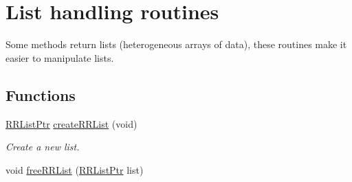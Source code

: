 \hypertarget{group__list}{\section{List handling routines}
\label{group__list}
}


Some methods return lists (heterogeneous arrays of data), these routines make it easier to manipulate lists.  


\subsection*{Functions}
\begin{DoxyCompactItemize}
\item 
\hyperlink{rrc__types_8h_a32a8a60ac06858ff3a791672bd2bec73}{R\+R\+List\+Ptr} \hyperlink{group__list_gab6b39b0c87e8b3c9d416c99223d98bb5}{create\+R\+R\+List} (void)
\begin{DoxyCompactList}\small\item\em Create a new list. \end{DoxyCompactList}\item 
\hypertarget{group__list_ga1382c85efff1e5ef2c45a28321da99a6}{void \hyperlink{group__list_ga1382c85efff1e5ef2c45a28321da99a6}{free\+R\+R\+List} (\hyperlink{rrc__types_8h_a32a8a60ac06858ff3a791672bd2bec73}{R\+R\+List\+Ptr} list)}\label{group__list_ga1382c85efff1e5ef2c45a28321da99a6}


\end{DoxyCompactItemize}
